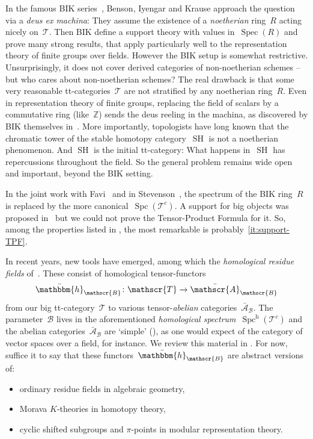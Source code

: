 \documentclass[JEP,XML,SOM,Unicode]{cedram}
\numberwithin{equation}{section}
\theoremstyle{definition}
\DeclareMathOperator{\Spc}{Spc}
\DeclareMathOperator{\Spec}{Spec}
\newcommand{\bbZ}{\mathbb{Z}}
\newcommand{\cat}[1]{\mathscr{#1}}
\DeclareMathOperator{\SH}{SH}
\newcommand{\smallh}{\mathrm{h}}
\newcommand{\AB}{\bar{\cA}_{\cB}}
\newcommand{\bat}[1]{\bar{\cat{#1}}}
\newcommand{\boneda}{\bar\yoneda}
\newcommand{\cA}{\cat{A}}
\newcommand{\cB}{\cat{B}}
\newcommand{\cT}{\cat{T}}
\newcommand{\hB}{\boneda_{\cB}}
\newcommand{\SpchT}{\Spch(\cat{T}^c)}
\newcommand{\Spch}{\Spc^{\smallh}}
\newcommand{\SpcT}{\Spc(\cat{T}^c)}
\newcommand{\yoneda}{\mathbbm{h}}
\begin{document}
In the famous BIK series~\cite{BensonIyengarKrause08,BensonIyengarKrause11c,BensonIyengarKrause11a,BensonIyengarKrause12a,BensonIyengarKrause12b}, Benson, Iyengar and Krause approach the question via a \textsl{deus ex machina}: They assume the existence of a \emph{noetherian} ring~$R$ acting nicely on~$\cT$. Then BIK define a support theory with values in~$\Spec(R)$ and prove many strong results, that apply particularly well to the representation theory of finite groups over fields. However the BIK setup is somewhat restrictive. Unsurprisingly, it does not cover derived categories of non-noetherian schemes -- but who cares about non-noetherian schemes? The real drawback is that some very reasonable tt-categories~$\cT$ are not stratified by any noetherian ring~$R$. Even in representation theory of finite groups, replacing the field of scalars by a commutative ring (like~$\bbZ$) sends the deus reeling in the machina, as discovered by BIK themselves in~\cite{BensonIyengarKrause13}. More importantly, topologists have long known that the chromatic tower of the stable homotopy category~$\SH$ is not a noetherian phenomenon. And $\SH$ is the initial tt-category: What happens in~$\SH$ has repercussions throughout the field. So the general problem remains wide open and important, beyond the BIK setting.

In the joint work with Favi~\cite{BalmerFavi11} and in Stevenson~\cite{Stevenson13}, the spectrum of the BIK ring~$R$ is replaced by the more canonical~$\SpcT$. A support for big objects was proposed in~\cite{BalmerFavi11} but we could not prove the Tensor-Product Formula for it. So, among the properties listed in , the most remarkable is probably~\eqref{it:support-TPF}.

In recent years, new tools have emerged, among which the \emph{homological residue fields} of~\cite{BalmerKrauseStevenson19,Balmer20a}. These consist of homological tensor-functors
\begin{equation}
\label{eq:hB-intro}
\hB\colon \cT\to \bat{A}_{\cB}
\end{equation}
from our big tt-category~$\cT$ to various tensor-\emph{abelian} categories~$\AB$. The parameter~$\cB$ lives in the aforementioned \emph{homological spectrum}~$\SpchT$ and the abelian categories~$\AB$ are `simple' (), as one would expect of the category of vector spaces over a field, for instance. We review this material in . For now, suffice it to say that these functors~$\hB$ are abstract versions of:
\begin{itemize}
\item[--] ordinary residue fields in algebraic geometry,
\item[--] Morava $K$-theories in homotopy theory,
\item[--] cyclic shifted subgroups and $\pi$-points in modular representation theory.
\end{itemize}
\end{document}
